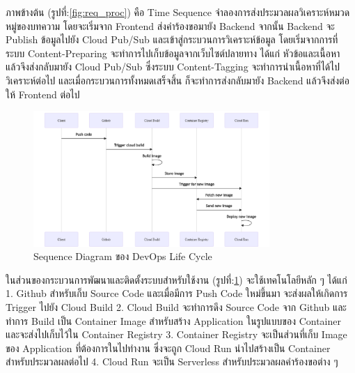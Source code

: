 \documentclass[12pt,oneside,openright,a4paper]{cpe-thai-project}
\begin{document}
  \hspace{1cm}ภาพข้างต้น (รูปที่:\ref{fig:req_proc}) คือ Time Sequence จำลองการส่งประมวลผลวิเคราะห์หมวดหมู่ของบทความ โดยจะเริ่มจาก Frontend ส่งคำร้องขอมายัง Backend 
  จากนั้น Backend จะ Publish ข้อมูลไปยัง Cloud Pub/Sub และเข้าสู่กระบวนการวิเคราะห์ข้อมูล โดยเริ่มจากการที่ระบบ Content-Preparing จะทำการไปเก็บข้อมูลจากเว็บไซต์ปลายทาง 
  ได้แก่ หัวข้อและเนื้อหา แล้วจึงส่งกลับมายัง Cloud Pub/Sub ซึ่งระบบ Content-Tagging จะทำการนำเนื้อหาที่ได้ไปวิเคราะห์ต่อไป และเมื่อกระบวนการทั้งหมดเสร็จสิ้น ก็จะทำการส่งกลับมายัง Backend 
  แล้วจึงส่งต่อให้ Frontend ต่อไป
  \newpage
  \begin{figure}[!ht]\centering
    \includegraphics[width=0.8\textwidth]{./img/devops.png}
    \caption{Sequence Diagram ของ DevOps Life Cycle}\label{fig:devops} 
  \end{figure}
  
  ในส่วนของกระบวนการพัฒนาและติดตั้งระบบสำหรับใช้งาน (รูปที่:\ref{fig:devops}) จะใช้เทคโนโลยีหลัก ๆ ได้แก่ 
  \newline\hspace*{0.5cm} 1. Github สำหรับเก็บ Source Code และเมื่อมีการ Push Code ใหม่ขึ้นมา จะส่งผลให้เกิดการ Trigger ไปยัง Cloud Build
  \newline\hspace*{0.5cm} 2. Cloud Build จะทำการดึง Source Code จาก Github และทำการ Build เป็น Container Image สำหรับสร้าง Application ในรูปแบบของ Container และจะส่งไปเก็บไว้ใน Container Registry
  \newline\hspace*{0.5cm} 3. Container Registry จะเป็นส่วนที่เก็บ Image ของ Application ที่ต้องการในไปทำงาน ซึ่งจะถูก Cloud Run นำไปสร้างเป็น Container สำหรับประมวลผลต่อไป
  \newline\hspace*{0.5cm} 4. Cloud Run จะเป็น Serverless สำหรับประมวลผลคำร้องขอต่าง ๆ 
  
\end{document}
